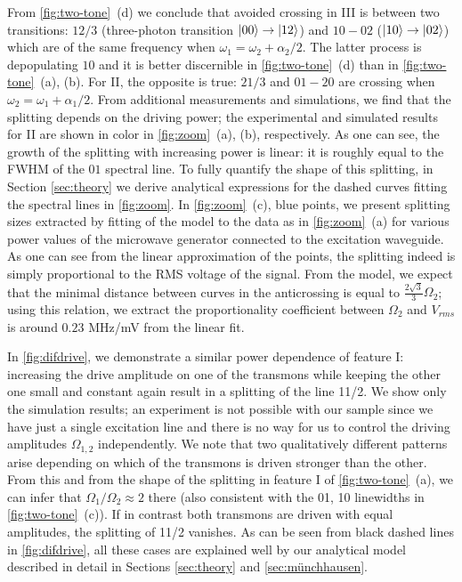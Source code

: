 \documentclass[%
 aps, prx,
 amsmath,amssymb,
 reprint,%
superscriptaddress
]{revtex4-2}
\begin{document}
From \autoref{fig:two-tone}~(d) we conclude that 
avoided crossing in III is between two 
transitions: ${12/3}$ (three-photon transition $\ket{00}\rightarrow\ket{12}$) and ${10} - {02}$ 
($\ket{10}\rightarrow\ket{02}$) which are of the 
same frequency when $\omega_1 = 
\omega_2+\alpha_2/2$. The latter process is depopulating $10$ and it is better discernible in \autoref{fig:two-tone}~(d) 
than in \autoref{fig:two-tone}~(a), (b). For II, the 
opposite is true: ${21/3}$ and ${01} - {20}$ are 
crossing when $\omega_2 = \omega_1+\alpha_1/2$. 
From additional measurements and simulations, we 
find that the splitting depends on the driving 
power; the experimental and simulated results for 
II are shown in color in \autoref{fig:zoom}~(a), (b), respectively. As one can see, the growth of the splitting with 
increasing power is linear: it is roughly equal 
to the FWHM of the ${01}$ spectral line. To fully 
quantify the shape of this splitting, in Section 
\ref{sec:theory} we derive analytical expressions 
for the dashed curves fitting the spectral lines 
in \autoref{fig:zoom}. In \autoref{fig:zoom}~(c), blue points, we present splitting sizes extracted by fitting of the model to the data as in \autoref{fig:zoom}~(a) for various power values of the microwave generator connected to the excitation waveguide. As one can see from the linear approximation of the points, the splitting indeed is simply proportional to the RMS voltage of the signal. From the model, we expect that the minimal distance between curves in the anticrossing is equal to $\frac{2\sqrt{3}}{3} \Omega_2$; using this relation, we extract the proportionality coefficient between $\Omega_2$ and $V_{rms}$ is around $0.23$ MHz/mV from the linear fit.

In \autoref{fig:difdrive}, we demonstrate a similar power dependence of feature I: increasing the drive amplitude on one of the 
transmons while keeping the other one small and 
constant again result in a splitting of the line 11/2. We show only the simulation results; an experiment is not possible with our sample since we have just a single excitation line and there is 
no way for us to control the driving amplitudes 
$\Omega_{1,2}$ independently. We note that two 
qualitatively different patterns arise depending 
on which of the transmons is driven stronger than 
the other. From this and from the shape of the 
splitting in feature I of 
\autoref{fig:two-tone}~(a), we can infer that 
$\Omega_1/\Omega_2 \approx 2$ there (also 
consistent with the 01, 10 linewidths in 
\autoref{fig:two-tone}~(c)). If in contrast both transmons are driven with equal amplitudes, the splitting of 11/2 vanishes. As can be seen from black dashed lines in \autoref{fig:difdrive}, all these cases are explained well by our analytical model described in detail in Sections \ref{sec:theory} and \ref{sec:münchhausen}.
\end{document}
